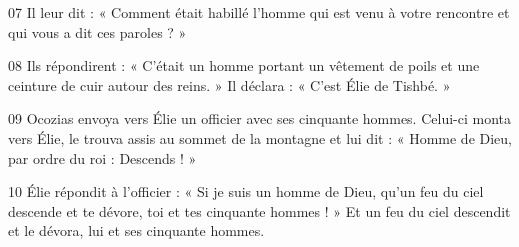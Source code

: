 
07 Il leur dit : « Comment était habillé l’homme qui est venu à votre rencontre et qui vous a dit ces paroles ? »

08 Ils répondirent : « C’était un homme portant un vêtement de poils et une ceinture de cuir autour des reins. » Il déclara : « C’est Élie de Tishbé. »

09 Ocozias envoya vers Élie un officier avec ses cinquante hommes. Celui-ci monta vers Élie, le trouva assis au sommet de la montagne et lui dit : « Homme de Dieu, par ordre du roi : Descends ! »

10 Élie répondit à l’officier : « Si je suis un homme de Dieu, qu’un feu du ciel descende et te dévore, toi et tes cinquante hommes ! » Et un feu du ciel descendit et le dévora, lui et ses cinquante hommes.	